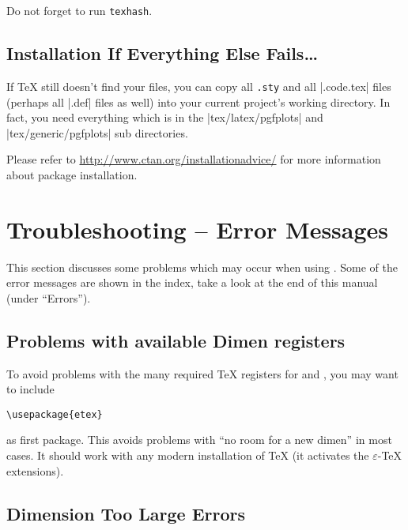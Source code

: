 Do not forget to run \lstinline!texhash!.

\subsection{Installation If Everything Else Fails\ldots}

If \TeX{} still doesn't find your files, you can copy all \lstinline!.sty! and
all |.code.tex| files (perhaps all |.def| files as well) into your current
project's working directory. In fact, you need everything which is in the
|tex/latex/pgfplots| and |tex/generic/pgfplots| sub directories.

Please refer to \url{http://www.ctan.org/installationadvice/} for more
information about package installation.


\section[errors]{Troubleshooting -- Error Messages}

This section discusses some problems which may occur when using \PGFPlots{}.
Some of the error messages are shown in the index, take a look at the end of
this manual (under ``Errors'').


\subsection{Problems with available Dimen registers}

To avoid problems with the many required \TeX{} registers for \PGF{} and
\PGFPlots{}, you may want to include
%
\begin{verbatim}
\usepackage{etex}
\end{verbatim}
%
as first package. This avoids problems with ``no room for a new
dimen'' in most cases. It should
work with any modern installation of \TeX{} (it activates the
$\varepsilon$-\TeX{} extensions).


\subsection{Dimension Too Large Errors}

